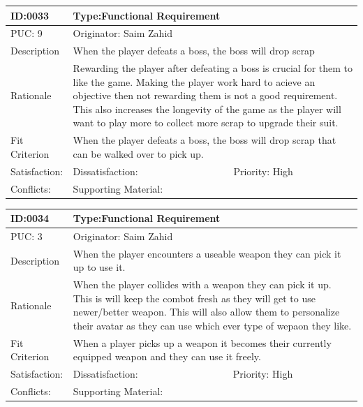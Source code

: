 \documentclass{article}
\begin{document}
	\begin{table}[H]
		\begin{tabular}{|l|l|l|}
			\hline
			ID:0033 & \multicolumn{2}{l|}{Type:Functional Requirement} \\ \hline
			PUC: 9 & \multicolumn{2}{l|}{Originator: Saim Zahid} \\ \hline
			Description & \multicolumn{2}{m{0.85\textwidth}|}{When the player defeats a boss, the boss will drop scrap} \\ \hline
			Rationale & \multicolumn{2}{m{0.85\textwidth}|}{Rewarding the player after defeating a boss is crucial for them to like the game. Making the player work hard to acieve an objective then not rewarding them is not a good requirement. This also increases the longevity of the game as the player will want to play more to collect more scrap to upgrade their suit.} \\ \hline
			Fit Criterion & \multicolumn{2}{m{0.85\textwidth}|}{When the player defeats a boss, the boss will drop scrap that can be walked over to pick up.} \\ \hline
			Satisfaction: & Dissatisfaction: & Priority: High\\ \hline
			Conflicts: & \multicolumn{2}{l|}{Supporting Material:} \\ \hline
		\end{tabular}
	\end{table}

	\begin{table}[H]
		\begin{tabular}{|l|l|l|}
			\hline
			ID:0034 & \multicolumn{2}{l|}{Type:Functional Requirement} \\ \hline
			PUC: 3 & \multicolumn{2}{l|}{Originator: Saim Zahid} \\ \hline
			Description & \multicolumn{2}{m{0.85\textwidth}|}{When the player encounters a useable weapon they can pick it up to use it.} \\ \hline
			Rationale & \multicolumn{2}{m{0.85\textwidth}|}{When the player collides with a weapon they can pick it up. This is will keep the combot fresh as they will get to use newer/better weapon. This will also allow them to personalize their avatar as they can use which ever type of wepaon they like.} \\ \hline
			Fit Criterion & \multicolumn{2}{m{0.85\textwidth}|}{When a player picks up a weapon it becomes their currently equipped weapon and they can use it freely.} \\ \hline
			Satisfaction: & Dissatisfaction: & Priority: High\\ \hline
			Conflicts: & \multicolumn{2}{l|}{Supporting Material:} \\ \hline
		\end{tabular}
	\end{table}
\end{document}
